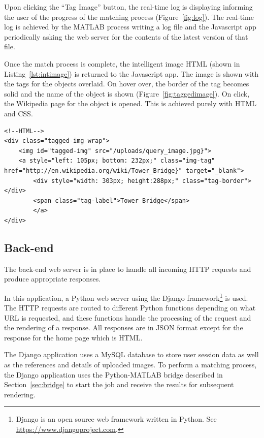 \documentclass[11pt, onecolumn, a4paper, final]{report} %
\begin{document}
Upon clicking the ``Tag Image'' button, the real-time log is displaying informing the user of the progress of the matching process (Figure~\ref{fig:log}). The real-time log is achieved by the MATLAB process writing a log file and the Javascript app periodically asking the web server for the contents of the latest version of that file.

Once the match process is complete, the intelligent image HTML (shown in Listing~\ref{lst:intimage}) is returned to the Javascript app. The image is shown with the tags for the objects overlaid. On hover over, the border of the tag becomes solid and the name of the object is shown (Figure~\ref{fig:taggedimage}). On click, the Wikipedia page for the object is opened. This is achieved purely with HTML and CSS.

\linespread{1} %
\lstset{language=HTML,caption=The HTML code for the intelligent image.,label=lst:intimage}
\begin{lstlisting}[frame=single]
<!--HTML-->
<div class="tagged-img-wrap">
	<img id="tagged-img" src="/uploads/query_image.jpg}">
	<a style="left: 105px; bottom: 232px;" class="img-tag" href="http://en.wikipedia.org/wiki/Tower_Bridge}" target="_blank">
		<div style="width: 303px; height:288px;" class="tag-border"></div>
		<span class="tag-label">Tower Bridge</span>
        </a>
</div>
\end{lstlisting}
\linespread{2} %

\subsection{Back-end}
\label{subsec:back}
The back-end web server is in place to handle all incoming HTTP requests and produce appropriate responses. 

In this application, a Python web server using the Django framework\footnote{Django is an open source web framework written in Python. See \url{https://www.djangoproject.com}.} is used. The HTTP requests are routed to different Python functions depending on what URL is requested, and these functions handle the processing of the request and the rendering of a response. All responses are in JSON format except for the response for the home page which is HTML.

The Django application uses a MySQL database to store user session data as well as the references and details of uploaded images. To perform a matching process, the Django application uses the Python-MATLAB bridge described in Section~\ref{sec:bridge} to start the job and receive the results for subsequent rendering.
\end{document}
